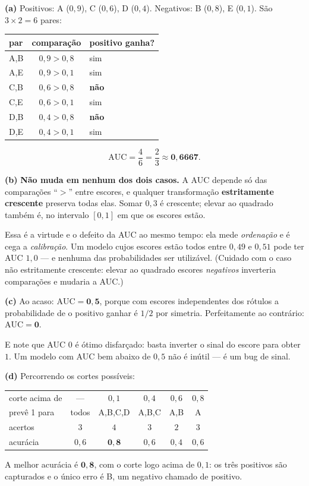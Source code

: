 \documentclass[11pt,a4paper]{article}
\begin{document}
\begin{solucao}
\textbf{(a)} Positivos: A ($0{,}9$), C ($0{,}6$), D ($0{,}4$). Negativos: B
($0{,}8$), E ($0{,}1$). São $3\times 2=6$ pares:
\begin{center}\small
\begin{tabular}{@{}lcl@{}}
\toprule
par & comparação & positivo ganha? \\
\midrule
A,B & $0{,}9>0{,}8$ & sim \\
A,E & $0{,}9>0{,}1$ & sim \\
C,B & $0{,}6>0{,}8$ & \textbf{não} \\
C,E & $0{,}6>0{,}1$ & sim \\
D,B & $0{,}4>0{,}8$ & \textbf{não} \\
D,E & $0{,}4>0{,}1$ & sim \\
\bottomrule
\end{tabular}
\end{center}
\[
  \mathrm{AUC} = \frac{4}{6} = \frac23 \approx \mathbf{0{,}6667}.
\]

\smallskip
\textbf{(b)} \textbf{Não muda em nenhum dos dois casos.} A AUC depende só das
comparações ``$>$'' entre escores, e qualquer transformação
\textbf{estritamente crescente} preserva todas elas. Somar $0{,}3$ é crescente;
elevar ao quadrado também é, no intervalo $[0,1]$ em que os escores estão.

Essa é a virtude e o defeito da AUC ao mesmo tempo: ela mede \emph{ordenação} e
é cega a \emph{calibração}. Um modelo cujos escores estão todos entre $0{,}49$ e
$0{,}51$ pode ter AUC $1{,}0$ --- e nenhuma das probabilidades ser utilizável.
(Cuidado com o caso não estritamente crescente: elevar ao quadrado escores
\emph{negativos} inverteria comparações e mudaria a AUC.)

\smallskip
\textbf{(c)} Ao acaso: $\mathrm{AUC}=\mathbf{0{,}5}$, porque com escores
independentes dos rótulos a probabilidade de o positivo ganhar é $1/2$ por
simetria. Perfeitamente ao contrário: $\mathrm{AUC}=\mathbf{0}$.

E note que AUC $0$ é ótimo disfarçado: basta inverter o sinal do escore para obter
$1$. Um modelo com AUC bem abaixo de $0{,}5$ não é inútil --- é um bug de sinal.

\smallskip
\textbf{(d)} Percorrendo os cortes possíveis:
\begin{center}\small
\begin{tabular}{@{}lccccc@{}}
\toprule
corte acima de & --- & $0{,}1$ & $0{,}4$ & $0{,}6$ & $0{,}8$ \\
prevê 1 para   & todos & A,B,C,D & A,B,C & A,B & A \\
acertos        & $3$ & $4$ & $3$ & $2$ & $3$ \\
acurácia       & $0{,}6$ & $\mathbf{0{,}8}$ & $0{,}6$ & $0{,}4$ & $0{,}6$ \\
\bottomrule
\end{tabular}
\end{center}
A melhor acurácia é $\mathbf{0{,}8}$, com o corte logo acima de $0{,}1$: os três
positivos são capturados e o único erro é B, um negativo chamado de positivo.


\end{solucao}
\end{document}
